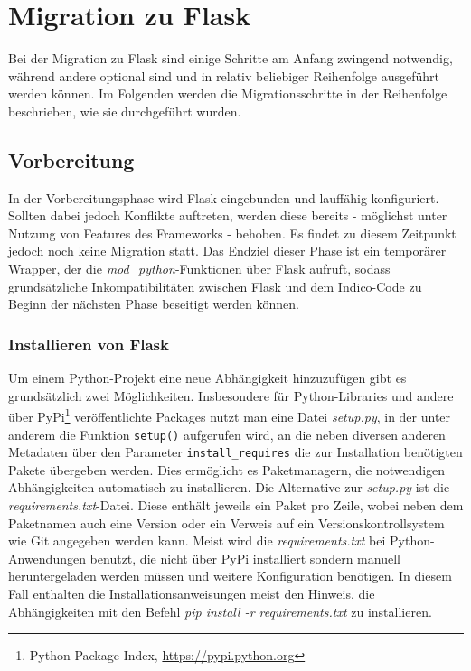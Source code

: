 \chapter{Migration zu Flask}
Bei der Migration zu Flask sind einige Schritte am Anfang zwingend notwendig, während andere
optional sind und in relativ beliebiger Reihenfolge ausgeführt werden können. Im Folgenden
werden die Migrationsschritte in der Reihenfolge beschrieben, wie sie durchgeführt wurden.


\section{Vorbereitung}
In der Vorbereitungsphase wird Flask eingebunden und lauffähig konfiguriert. Sollten dabei jedoch
Konflikte auftreten, werden diese bereits - möglichst unter Nutzung von Features des Frameworks -
behoben. Es findet zu diesem Zeitpunkt jedoch noch keine Migration statt. Das Endziel dieser Phase
ist ein temporärer Wrapper, der die \emph{mod\_python}-Funktionen über Flask aufruft, sodass
grundsätzliche Inkompatibilitäten zwischen Flask und dem Indico-Code zu Beginn der nächsten Phase
beseitigt werden können.


\subsection{Installieren von Flask}
Um einem Python-Projekt eine neue Abhängigkeit hinzuzufügen gibt es grundsätzlich zwei
Möglichkeiten. Insbesondere für Python-Libraries und andere über PyPi\footnote{Python Package Index,
\href{https://pypi.python.org}{https://pypi.python.org}} veröffentlichte Packages nutzt man eine
Datei \emph{setup.py}, in der unter anderem die Funktion \lstinline{setup()} aufgerufen wird, an die
neben diversen anderen Metadaten über den Parameter \lstinline{install_requires} die zur
Installation benötigten Pakete übergeben werden. Dies ermöglicht es Paketmanagern, die notwendigen
Abhängigkeiten automatisch zu installieren. Die Alternative zur \emph{setup.py} ist die
\emph{requirements.txt}-Datei. Diese enthält jeweils ein Paket pro Zeile, wobei neben dem Paketnamen
auch eine Version oder ein Verweis auf ein Versionskontrollsystem wie Git angegeben
werden kann. Meist wird die \emph{requirements.txt} bei Python-Anwendungen benutzt, die nicht über
PyPi installiert sondern manuell heruntergeladen werden müssen und weitere Konfiguration benötigen.
In diesem Fall enthalten die Installationsanweisungen meist den Hinweis, die Abhängigkeiten mit den
Befehl \emph{pip install -r requirements.txt} zu installieren.

